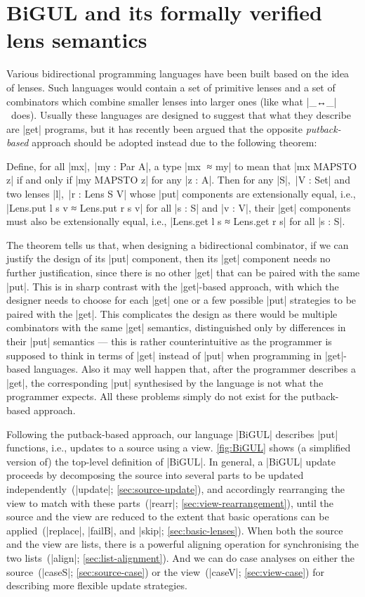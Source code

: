 \documentclass[fleqn]{llncs}
\renewcommand{\emph}{\textsl}
\begin{document}
\section{BiGUL and its formally verified lens semantics}
\label{sec:BiGUL}

Various bidirectional programming languages have been built based on the idea of lenses.
Such languages would contain a set of primitive lenses and a set of combinators which combine smaller lenses into larger ones (like what |_↔_|~does).
Usually these languages are designed to suggest that what they describe are |get| programs, but it has recently been argued that the opposite \emph{putback-based} approach should be adopted instead due to the following theorem:
\begin{theorem*}
Define, for all |mx|,~|my : Par A|, a type |mx ^^^≈ my| to mean that |mx MAPSTO z| if and only if |my MAPSTO z| for any |z : A|.
Then for any |S|,~|V : Set| and two lenses |l|,~|r : Lens S V| whose |put| components are extensionally equal, i.e.,
|Lens.put l s v ≈ Lens.put r s v| for all |s : S| and |v : V|, their |get| components must also be extensionally equal, i.e., |Lens.get l s ≈ Lens.get r s| for all |s : S|.
\end{theorem*}
The theorem tells us that, when designing a bidirectional combinator, if we can justify the design of its |put| component, then its |get| component needs no further justification, since there is no other |get| that can be paired with the same |put|.
This is in sharp contrast with the |get|-based approach, with which the designer needs to choose for each |get| one or a few possible |put| strategies to be paired with the |get|.
This complicates the design as there would be multiple combinators with the same |get| semantics, distinguished only by differences in their |put| semantics --- this is rather counterintuitive as the programmer is supposed to think in terms of |get| instead of |put| when programming in |get|-based languages.
Also it may well happen that, after the programmer describes a |get|, the corresponding |put| synthesised by the language is not what the programmer expects.
All these problems simply do not exist for the putback-based approach.

Following the putback-based approach, our language |BiGUL| describes |put| functions, i.e., updates to a source using a view.
\autoref{fig:BiGUL} shows (a simplified version of) the top-level definition of |BiGUL|.
In general, a |BiGUL| update proceeds by decomposing the source into several parts to be updated independently~(|update|; \autoref{sec:source-update}), and accordingly rearranging the view to match with these parts~(|rearr|; \autoref{sec:view-rearrangement}), until the source and the view are reduced to the extent that basic operations can be applied~(|replace|, |failB|, and |skip|; \autoref{sec:basic-lenses}).
When both the source and the view are lists, there is a powerful aligning operation for synchronising the two lists~(|align|; \autoref{sec:list-alignment}).
And we can do case analyses on either the source~(|caseS|; \autoref{sec:source-case}) or the view~(|caseV|; \autoref{sec:view-case}) for describing more flexible update strategies.
\end{document}
